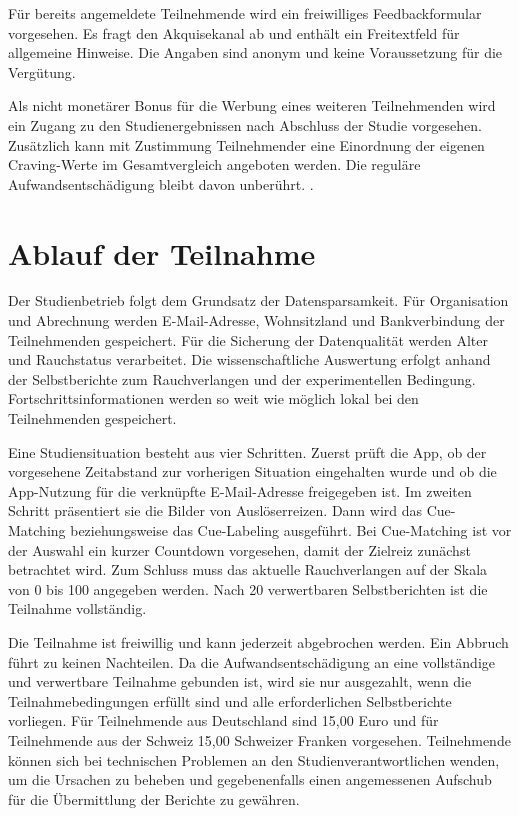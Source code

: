 Für bereits angemeldete Teilnehmende wird ein freiwilliges Feedbackformular vorgesehen. Es fragt den Akquisekanal ab und enthält ein Freitextfeld für allgemeine Hinweise. Die Angaben sind anonym und keine Voraussetzung für die Vergütung.

Als nicht monetärer Bonus für die Werbung eines weiteren Teilnehmenden wird ein Zugang zu den Studienergebnissen nach Abschluss der Studie vorgesehen. Zusätzlich kann mit Zustimmung Teilnehmender eine Einordnung der eigenen Craving-Werte im Gesamtvergleich angeboten werden. Die reguläre Aufwandsentschädigung bleibt davon unberührt. \cite{anastasiRecruitmentRetentionClinical2024,klompstraChallengesStrategiesEffective2025}.

\section{Ablauf der Teilnahme}

Der Studienbetrieb folgt dem Grundsatz der Datensparsamkeit. Für Organisation und Abrechnung werden E-Mail-Adresse, Wohnsitzland und Bankverbindung der Teilnehmenden gespeichert. Für die Sicherung der Datenqualität werden Alter und Rauchstatus verarbeitet. Die wissenschaftliche Auswertung erfolgt anhand der Selbstberichte zum Rauchverlangen und der experimentellen Bedingung. Fortschrittsinformationen werden so weit wie möglich lokal bei den Teilnehmenden gespeichert.

Eine Studiensituation besteht aus vier Schritten. Zuerst prüft die App, ob der vorgesehene Zeitabstand zur vorherigen Situation eingehalten wurde und ob die App-Nutzung für die verknüpfte E-Mail-Adresse freigegeben ist. Im zweiten Schritt präsentiert sie die Bilder von Auslöserreizen. Dann wird das Cue-Matching beziehungsweise das Cue-Labeling ausgeführt. Bei Cue-Matching ist vor der Auswahl ein kurzer Countdown vorgesehen, damit der Zielreiz zunächst betrachtet wird. Zum Schluss muss das aktuelle Rauchverlangen auf der Skala von 0 bis 100 angegeben werden. Nach 20 verwertbaren Selbstberichten ist die Teilnahme vollständig.

Die Teilnahme ist freiwillig und kann jederzeit abgebrochen werden. Ein Abbruch führt zu keinen Nachteilen. Da die Aufwandsentschädigung an eine vollständige und verwertbare Teilnahme gebunden ist, wird sie nur ausgezahlt, wenn die Teilnahmebedingungen erfüllt sind und alle erforderlichen Selbstberichte vorliegen. Für Teilnehmende aus Deutschland sind 15,00 Euro und für Teilnehmende aus der Schweiz 15,00 Schweizer Franken vorgesehen. Teilnehmende können sich bei technischen Problemen an den Studienverantwortlichen wenden, um die Ursachen zu beheben und gegebenenfalls einen angemessenen Aufschub für die Übermittlung der Berichte zu gewähren.


